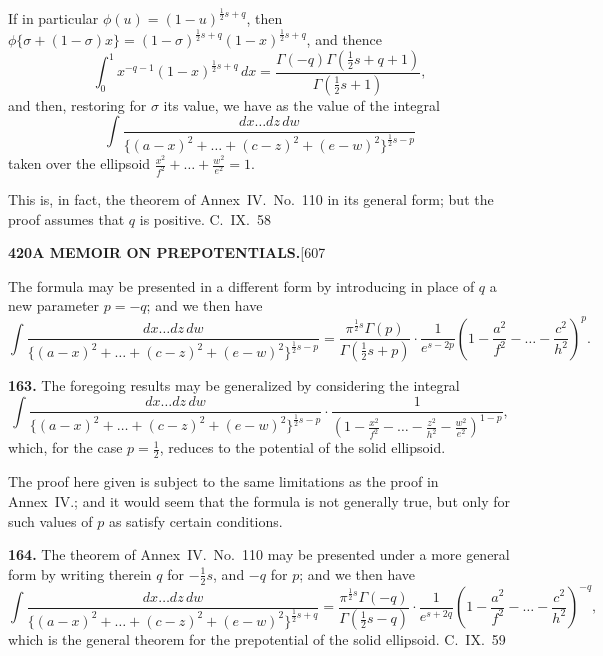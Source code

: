 \documentclass[11pt,a4paper]{article}
\begin{document}
{If in particular $\phi(u) = (1-u)^{\frac{1}{2}s+q}$, then $\phi\{\sigma + (1-\sigma)x\} = (1-\sigma)^{\frac{1}{2}s+q}(1-x)^{\frac{1}{2}s+q}$, and thence
\[
\int_0^1 x^{-q-1}(1-x)^{\frac{1}{2}s+q}\, dx = \frac{\Gamma(-q)\Gamma(\frac{1}{2}s+q+1)}{\Gamma(\frac{1}{2}s+1)},
\]
and then, restoring for $\sigma$ its value, we have as the value of the integral
\[
\int \frac{dx\ldots dz\, dw}{\{(a-x)^2 + \ldots + (c-z)^2 + (e-w)^2\}^{\frac{1}{2}s-p}}
\]
taken over the ellipsoid $\frac{x^2}{f^2} + \ldots + \frac{w^2}{e^2} = 1$.

This is, in fact, the theorem of Annex~IV.\ No.~110 in its general form; but the proof assumes that $q$ is positive.
\hfill C.~IX.\ 58

\newpage
\noindent\textbf{420}\hspace{\fill}\textbf{A MEMOIR ON PREPOTENTIALS.}\hspace{\fill}[607

The formula may be presented in a different form by introducing in place of $q$ a new parameter $p = -q$; and we then have
\[
\int \frac{dx\ldots dz\, dw}{\{(a-x)^2 + \ldots + (c-z)^2 + (e-w)^2\}^{\frac{1}{2}s-p}} = \frac{\pi^{\frac{1}{2}s}\Gamma(p)}{\Gamma(\frac{1}{2}s+p)} \cdot \frac{1}{e^{s-2p}} \left(1 - \frac{a^2}{f^2} - \ldots - \frac{c^2}{h^2}\right)^{p}.
\]

\medskip
\noindent\textbf{163.}
The foregoing results may be generalized by considering the integral
\[
\int \frac{dx\ldots dz\, dw}{\{(a-x)^2 + \ldots + (c-z)^2 + (e-w)^2\}^{\frac{1}{2}s-p}} \cdot \frac{1}{(1 - \frac{x^2}{f^2} - \ldots - \frac{z^2}{h^2} - \frac{w^2}{e^2})^{1-p}},
\]
which, for the case $p = \frac{1}{2}$, reduces to the potential of the solid ellipsoid.

The proof here given is subject to the same limitations as the proof in Annex~IV.; and it would seem that the formula is not generally true, but only for such values of $p$ as satisfy certain conditions.

\medskip
\noindent\textbf{164.}
The theorem of Annex~IV.\ No.~110 may be presented under a more general form by writing therein $q$ for $-\frac{1}{2}s$, and $-q$ for $p$; and we then have
\[
\int \frac{dx\ldots dz\, dw}{\{(a-x)^2 + \ldots + (c-z)^2 + (e-w)^2\}^{\frac{1}{2}s+q}} = \frac{\pi^{\frac{1}{2}s}\Gamma(-q)}{\Gamma(\frac{1}{2}s-q)} \cdot \frac{1}{e^{s+2q}} \left(1 - \frac{a^2}{f^2} - \ldots - \frac{c^2}{h^2}\right)^{-q},
\]
which is the general theorem for the prepotential of the solid ellipsoid.
\hfill C.~IX.\ 59

}
\end{document}
